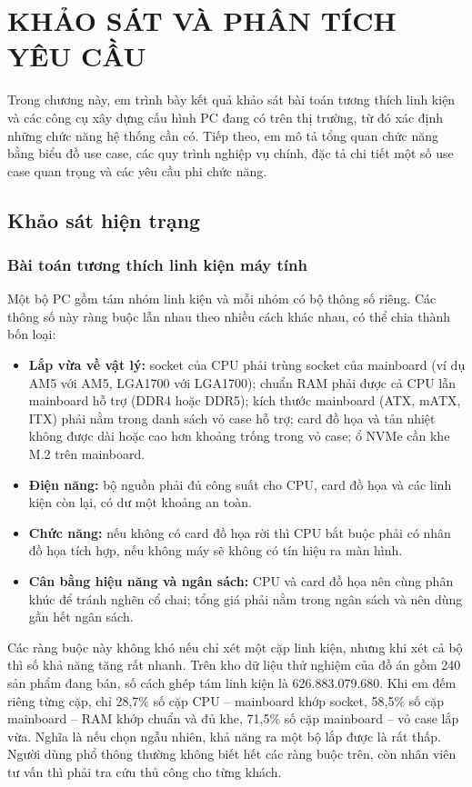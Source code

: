 \chapter{KHẢO SÁT VÀ PHÂN TÍCH YÊU CẦU}
\label{chap:khao-sat}

Trong chương này, em trình bày kết quả khảo sát bài toán tương thích linh kiện và các công cụ xây dựng cấu hình PC đang có trên thị trường, từ đó xác định những chức năng hệ thống cần có. Tiếp theo, em mô tả tổng quan chức năng bằng biểu đồ use case, các quy trình nghiệp vụ chính, đặc tả chi tiết một số use case quan trọng và các yêu cầu phi chức năng.

\section{Khảo sát hiện trạng}

\subsection{Bài toán tương thích linh kiện máy tính}

Một bộ PC gồm tám nhóm linh kiện và mỗi nhóm có bộ thông số riêng. Các thông số này ràng buộc lẫn nhau theo nhiều cách khác nhau, có thể chia thành bốn loại:
\begin{itemize}
  \item \textbf{Lắp vừa về vật lý:} socket của CPU phải trùng socket của mainboard (ví dụ AM5 với AM5, LGA1700 với LGA1700); chuẩn RAM phải được cả CPU lẫn mainboard hỗ trợ (DDR4 hoặc DDR5); kích thước mainboard (ATX, mATX, ITX) phải nằm trong danh sách vỏ case hỗ trợ; card đồ họa và tản nhiệt không được dài hoặc cao hơn khoảng trống trong vỏ case; ổ NVMe cần khe M.2 trên mainboard.
  \item \textbf{Điện năng:} bộ nguồn phải đủ công suất cho CPU, card đồ họa và các linh kiện còn lại, có dư một khoảng an toàn.
  \item \textbf{Chức năng:} nếu không có card đồ họa rời thì CPU bắt buộc phải có nhân đồ họa tích hợp, nếu không máy sẽ không có tín hiệu ra màn hình.
  \item \textbf{Cân bằng hiệu năng và ngân sách:} CPU và card đồ họa nên cùng phân khúc để tránh nghẽn cổ chai; tổng giá phải nằm trong ngân sách và nên dùng gần hết ngân sách.
\end{itemize}

Các ràng buộc này không khó nếu chỉ xét một cặp linh kiện, nhưng khi xét cả bộ thì số khả năng tăng rất nhanh. Trên kho dữ liệu thử nghiệm của đồ án gồm 240 sản phẩm đang bán, số cách ghép tám linh kiện là 626.883.079.680. Khi em đếm riêng từng cặp, chỉ 28,7\% số cặp CPU -- mainboard khớp socket, 58,5\% số cặp mainboard -- RAM khớp chuẩn và đủ khe, 71,5\% số cặp mainboard -- vỏ case lắp vừa. Nghĩa là nếu chọn ngẫu nhiên, khả năng ra một bộ lắp được là rất thấp. Người dùng phổ thông thường không biết hết các ràng buộc trên, còn nhân viên tư vấn thì phải tra cứu thủ công cho từng khách.

